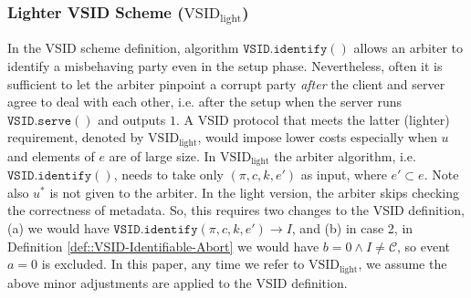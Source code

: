 \subsubsection{Lighter VSID Scheme ($\text{VSID}_{\scriptscriptstyle\text{light}}$)}\label{remark::light-VSID}
In the VSID scheme definition, algorithm  $\mathtt{VSID.identify}()$    allows an arbiter  to identify a misbehaving party even in the setup phase. Nevertheless, often it is sufficient  to let the arbiter pinpoint a corrupt party \emph{after} the client and server agree to deal with each other, i.e. after the setup when the server runs  $\mathtt{VSID.serve}()$ and outputs $1$. A VSID protocol that meets the latter (lighter) requirement, denoted by $\text{VSID}_{\scriptscriptstyle \text{light}}$, would impose lower costs  especially when $u$ and elements of $e$ are of large size. In $\text{VSID}_{\scriptscriptstyle\text{light}}$  the arbiter algorithm, i.e. $\mathtt{VSID.identify}()$, needs to take only $(\pi, c, k, e')$ as input, where $e'\subset e$. Note also $u^{\scriptscriptstyle *}$ is not given to the arbiter. In the light version, the arbiter   skips  checking the correctness of metadata. So, this requires two changes to the VSID definition, (a) we would have   $\mathtt{VSID.identify}(\pi,c,k,e')\rightarrow I$, and (b) in case 2, in Definition \ref{def::VSID-Identifiable-Abort} we would have $b=0\wedge I\neq \mathcal C$, so event $a=0$ is excluded. In this paper, any time we refer to $\text{VSID}_{\scriptscriptstyle\text{light}}$, we assume the above minor adjustments are applied to the VSID definition. 









